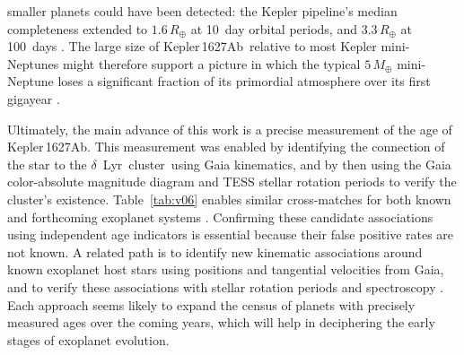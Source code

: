 \documentclass[12pt,modern,twocolumn,tighten]{aastex63}
\newcommand{\cn}{$\delta$\ Lyr\ cluster} %
\newcommand{\sn}{Kepler\,1627} %
\newcommand{\pn}{Kepler\,1627Ab} %
\begin{document}
  smaller planets could have been
detected\added{ in the \sn\ system}: the Kepler pipeline's median completeness extended to
$1.6\,R_\oplus$ at 10~day orbital periods, and $3.3\,R_\oplus$ at
100~days
\citep{2021ascl.soft07027B}.
 The large size of \pn\ relative
to most Kepler mini-Neptunes might therefore support a picture
in which the typical $5\,M_\oplus$ mini-Neptune
\citep{wu_mass_2019} loses a significant fraction of its primordial
atmosphere over its first gigayear
\citep{Owen_Wu_2013,ginzburg_corepowered_2018}.  


Ultimately, the main advance of this work is a precise measurement of
the age of \pn.   This measurement was enabled by identifying the
connection of the star to the \cn\ using Gaia kinematics, and by then 
using the Gaia color-absolute magnitude diagram and TESS stellar
rotation periods to verify the cluster's existence.
Table~\ref{tab:v06} enables similar cross-matches for both known and
forthcoming exoplanet systems \citep[{\it
e.g.},][]{guerrero_tess_2021}. Confirming these candidate associations
using independent age indicators is essential because their false
positive rates are not known.  A related path is to identify new
kinematic associations around known exoplanet host stars using
positions and tangential velocities from Gaia, and to verify
these associations with stellar rotation periods and spectroscopy
\citep[{\it e.g.},][]{tofflemire_tess_2021}.  Each approach seems
likely to expand the census of planets with precisely measured ages
over the coming years, which will help in deciphering the early stages
of exoplanet evolution.
\end{document}
